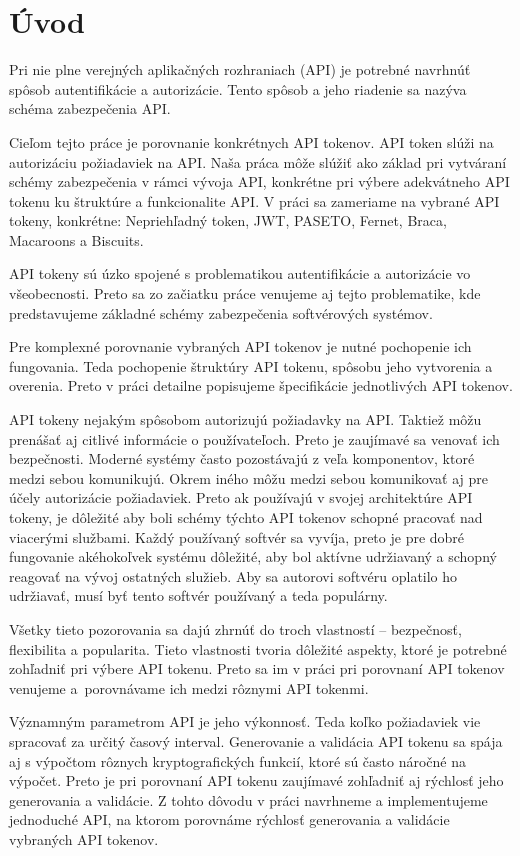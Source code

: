 \chapter*{Úvod} %

Pri nie plne verejných aplikačných rozhraniach (API) je potrebné navrhnúť spôsob autentifikácie a autorizácie. Tento spôsob a jeho riadenie sa nazýva schéma zabezpečenia API.

Cieľom tejto práce je porovnanie konkrétnych API tokenov. API token slúži na autorizáciu požiadaviek na API. Naša práca môže slúžiť ako základ pri vytváraní schémy zabezpečenia v rámci vývoja API, konkrétne pri výbere adekvátneho API tokenu ku štruktúre a funkcionalite API. V práci sa zameriame na vybrané API tokeny, konkrétne: Nepriehľadný token, JWT, PASETO, Fernet, Braca, Macaroons a Biscuits. 

API tokeny sú úzko spojené s problematikou autentifikácie a autorizácie vo všeobecnosti. Preto sa zo začiatku práce venujeme aj tejto problematike, kde predstavujeme základné schémy zabezpečenia softvérových systémov.

Pre komplexné porovnanie vybraných API tokenov je nutné pochopenie ich fungovania. Teda pochopenie štruktúry API tokenu, spôsobu jeho vytvorenia a overenia. Preto v práci detailne popisujeme špecifikácie jednotlivých API tokenov.

API tokeny nejakým spôsobom autorizujú požiadavky na API. Taktiež môžu prenášať aj citlivé informácie o používateľoch. Preto je zaujímavé sa venovať ich bezpečnosti. Moderné systémy často pozostávajú z veľa komponentov, ktoré medzi sebou komunikujú. Okrem iného môžu medzi sebou komunikovať aj pre účely autorizácie požiadaviek. Preto ak používajú v svojej architektúre API tokeny, je dôležité aby boli schémy týchto API tokenov schopné pracovať nad viacerými službami. Každý používaný softvér sa vyvíja, preto je pre dobré fungovanie akéhokoľvek systému dôležité, aby bol aktívne udržiavaný a schopný reagovať na vývoj ostatných služieb. Aby sa autorovi softvéru oplatilo ho udržiavať, musí byť tento softvér používaný a teda populárny.

Všetky tieto pozorovania sa dajú zhrnúť do troch vlastností -- bezpečnosť, flexibilita a popularita. Tieto vlastnosti tvoria dôležité aspekty, ktoré je potrebné zohľadniť pri výbere API tokenu. Preto sa im v práci pri porovnaní API tokenov venujeme a~porovnávame ich medzi rôznymi API tokenmi.

Významným parametrom API je jeho výkonnosť. Teda koľko požiadaviek vie spracovať za určitý časový interval. Generovanie a validácia API tokenu sa spája aj s výpočtom rôznych kryptografických funkcií, ktoré sú často náročné na výpočet. Preto je pri porovnaní API tokenu zaujímavé zohľadniť aj rýchlosť jeho generovania a validácie. Z tohto dôvodu v práci navrhneme a implementujeme jednoduché API, na ktorom porovnáme rýchlosť generovania a validácie vybraných API tokenov.
